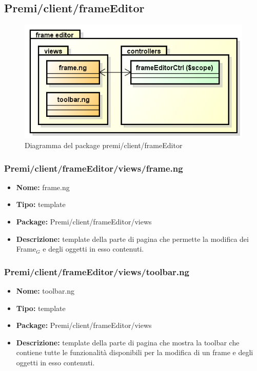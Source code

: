\subsection{Premi/client/frameEditor}
\begin{figure}[!h]
\begin{center}
\includegraphics[scale=0.45]{img/diapkg/frameEditor.png}
\caption{Diagramma del package premi/client/frameEditor}
\end{center}
\end{figure}
\subsubsection{Premi/client/frameEditor/views/frame.ng}
\begin{itemize}
  \item[] \textbf{Nome:} frame.ng
  \item[] \textbf{Tipo:} template
  \item[] \textbf{Package:} Premi/client/frameEditor/views
  \item[] \textbf{Descrizione:} template della parte di pagina che permette la modifica dei Frame$_G$ e degli oggetti in esso contenuti.
\end{itemize}
\subsubsection{Premi/client/frameEditor/views/toolbar.ng}
\begin{itemize}
  \item[] \textbf{Nome:} toolbar.ng
  \item[] \textbf{Tipo:} template
  \item[] \textbf{Package:} Premi/client/frameEditor/views
  \item[] \textbf{Descrizione:} template della parte di pagina che mostra la toolbar che contiene tutte le funzionalità disponibili per la modifica di un frame e degli oggetti in esso contenuti.
\end{itemize}
